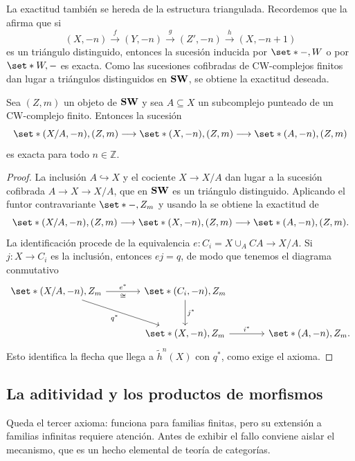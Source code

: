 La exactitud también se hereda de la estructura triangulada. Recordemos que la  afirma que si
\[
(X,-n)\xrightarrow{\ f\ }(Y,-n)\xrightarrow{\ g\ }(Z',-n)\xrightarrow{\ h\ }(X,-n+1)
\]
es un triángulo distinguido, entonces la sucesión inducida por $\set*{-,W}$ o por $\set*{W,-}$ es exacta. Como las sucesiones cofibradas de CW-complejos finitos dan lugar a triángulos distinguidos en $\mathbf{SW}$, se obtiene la exactitud deseada.

\begin{prop}\label{prop:exactitud}
Sea $(Z,m)$ un objeto de $\mathbf{SW}$ y sea $A\subseteq X$ un subcomplejo punteado de un CW-complejo finito. Entonces la sucesión
\[
\set*{(X/A,-n),(Z,m)}\longrightarrow\set*{(X,-n),(Z,m)}\longrightarrow\set*{(A,-n),(Z,m)}
\]
es exacta para todo $n\in\mathbb Z$.
\end{prop}
\begin{proof}
La inclusión $A\hookrightarrow X$ y el cociente $X\to X/A$ dan lugar a la sucesión cofibrada $A\to X\to X/A$, que en $\mathbf{SW}$ es un triángulo distinguido. Aplicando el funtor contravariante $\set*{-,Z_m}$ y usando la  se obtiene la exactitud de
\[
\set*{(X/A,-n),(Z,m)}\longrightarrow\set*{(X,-n),(Z,m)}\longrightarrow\set*{(A,-n),(Z,m)}.
\]
La identificación procede de la equivalencia $e\colon C_i=X\cup_A CA\to X/A$. Si $j\colon X\to C_i$ es la inclusión, entonces $ej=q$, de modo que tenemos el diagrama conmutativo
\[
\begin{tikzcd}[column sep=large,row sep=large]
\set*{(X/A,-n),Z_m} \arrow[r,"e^*","\cong"'] \arrow[dr,"q^*"'] & \set*{(C_i,-n),Z_m} \arrow[d,"j^*"]\\
& \set*{(X,-n),Z_m} \arrow[r,"i^*"] & \set*{(A,-n),Z_m}.
\end{tikzcd}
\]
Esto identifica la flecha que llega a $\tilde h^n(X)$ con $q^*$, como exige el axioma.
\end{proof}

\subsection{La aditividad y los productos de morfismos}

Queda el tercer axioma: funciona para familias finitas, pero su extensión a familias infinitas requiere atención. Antes de exhibir el fallo conviene aislar el mecanismo, que es un hecho elemental de teoría de categorías.

